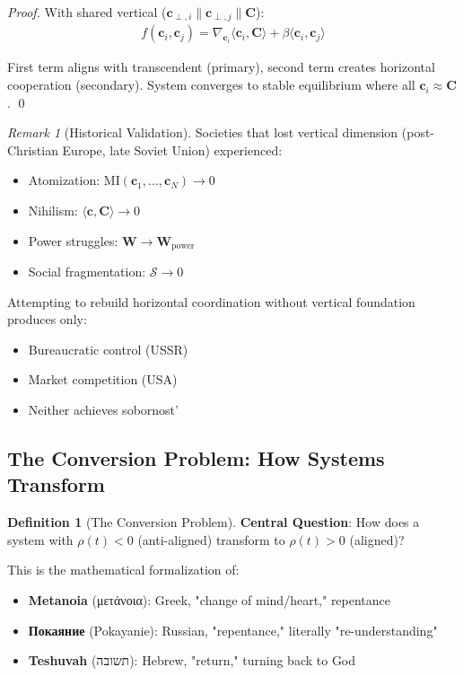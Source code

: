 \documentclass[11pt,a4paper]{article}
\theoremstyle{definition}
\newtheorem{definition}{Definition}[section]
\theoremstyle{remark}
\newtheorem{remark}{Remark}[section]
\newcommand{\WW}{\mathbf{W}}
\newcommand{\cc}{\mathbf{c}}
\begin{document}
\begin{small}
\begin{enumerate}
\begin{proof}
With shared vertical (\(\cc_{\perp,i} \parallel \cc_{\perp,j} \parallel \mathbf{C}\)):
\begin{align}
f(\cc_i, \cc_j) = \nabla_{\cc_i} \langle \cc_i, \mathbf{C} \rangle + \beta \langle \cc_i, \cc_j \rangle
\end{align}

First term aligns with transcendent (primary), second term creates horizontal cooperation (secondary). System converges to stable equilibrium where all \(\cc_i \approx \mathbf{C}\). \qed
\end{proof}

\begin{remark}[Historical Validation]
Societies that lost vertical dimension (post-Christian Europe, late Soviet Union) experienced:
\begin{itemize}
    \item Atomization: \(\text{MI}(\cc_1, \ldots, \cc_N) \to 0\)
    \item Nihilism: \(\langle \cc, \mathbf{C} \rangle \to 0\)
    \item Power struggles: \(\WW \to \WW_{\text{power}}\)
    \item Social fragmentation: \(\mathcal{S} \to 0\)
\end{itemize}

Attempting to rebuild horizontal coordination without vertical foundation produces only:
\begin{itemize}
    \item Bureaucratic control (USSR)
    \item Market competition (USA)
    \item Neither achieves sobornost'
\end{itemize}
\end{remark}

\subsection{The Conversion Problem: How Systems Transform}

\begin{definition}[The Conversion Problem]
\textbf{Central Question}: How does a system with \(\rho(t) < 0\) (anti-aligned) transform to \(\rho(t) > 0\) (aligned)?

This is the mathematical formalization of:
\begin{itemize}
    \item \textbf{Metanoia} (μετάνοια): Greek, "change of mind/heart," repentance
    \item \textbf{Покаяние} (Pokayanie): Russian, "repentance," literally "re-understanding"
    \item \textbf{Teshuvah} (תשובה): Hebrew, "return," turning back to God
\end{itemize}


\end{definition}
\end{enumerate}
\end{small}
\end{document}
